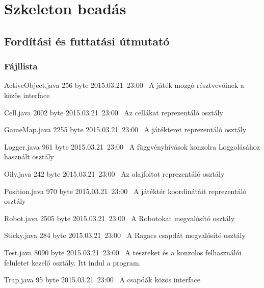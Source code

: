 %
\chapter{Szkeleton beadás}

\thispagestyle{fancy}

\section{Fordítási és futtatási útmutató}

\subsection{Fájllista}

\begin{fajllista}

\fajl
{ActiveObject.java} %
{256 byte} %
{2015.03.21~23:00~} %
{A játék mozgó résztvevőinek a közös interface} %

\fajl
{Cell.java} %
{2002 byte} %
{2015.03.21~23:00~} %
{Az cellákat reprezentáló osztály} %

\fajl
{GameMap.java} %
{2255 byte} %
{2015.03.21~23:00~} %
{A játékteret reprezentáló osztály} %

\fajl
{Logger.java} %
{961 byte} %
{2015.03.21~23:00~} %
{A függvényhívások konzolra Loggolásához használt osztály} %

\fajl
{Oily.java} %
{242 byte} %
{2015.03.21~23:00~} %
{Az olajfoltot reprezentáló osztály} %

\fajl
{Position.java} %
{970 byte} %
{2015.03.21~23:00~} %
{A játéktér koordinátáit reprezentáló osztály} %

\fajl
{Robot.java} %
{2505 byte} %
{2015.03.21~23:00~} %
{A Robotokat megvalósító osztály} %

\fajl
{Sticky.java} %
{284 byte} %
{2015.03.21~23:00~} %
{A Ragacs csapdát megvalósító osztály} %

\fajl
{Test.java} %
{8090 byte} %
{2015.03.21~23:00~} %
{A teszteket és a konzolos felhasználói felületet kezelő osztály. Itt indul a program.} %

\fajl
{Trap.java} %
{95 byte} %
{2015.03.21~23:00~} %
{A csapdák közös interface} %

\end{fajllista}

